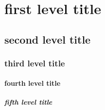 \chapter{first level title}
\section{second level title}
\subsection{third level title}
\subsubsection{fourth level title}
\paragraph{fifth level title}

